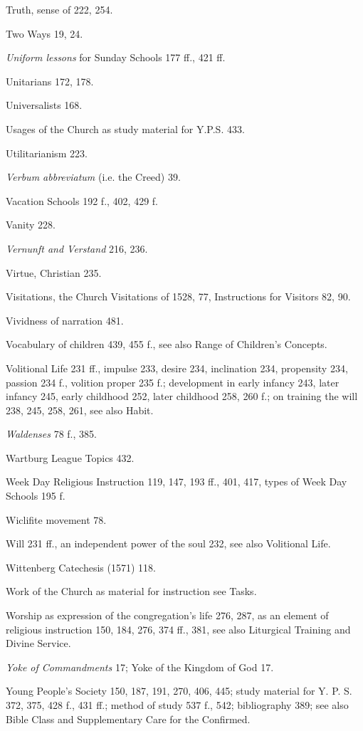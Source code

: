 Truth, sense of 222, 254.

Two Ways 19, 24.

\emph{Uniform lessons} for Sunday Schools 177 ff., 421 ff.

Unitarians 172, 178.

Universalists 168.

Usages of the Church as study material for Y.P.S. 433.

Utilitarianism 223.

\emph{\emph{Verbum abbreviatum}} (i.e. the Creed) 39.

Vacation Schools 192 f., 402, 429 f.

Vanity 228.

\emph{Vernunft and Verstand} 216, 236.

Virtue, Christian 235.

Visitations, the Church Visitations of 1528, 77, Instructions for Visitors 82, 90.

Vividness of narration 481.

Vocabulary of children 439, 455 f., see also Range of Children’s Concepts.

Volitional Life 231 ff., impulse 233, desire 234, inclination 234, propensity 234, passion 234 f., volition proper 235 f.; development in early infancy 243, later infancy 245, early childhood 252, later childhood 258, 260 f.; on training the will 238, 245, 258, 261, see also Habit.

\emph{Waldenses} 78 f., 385.

Wartburg League Topics 432.

Week Day Religious Instruction 119, 147, 193 ff., 401, 417, types of Week Day Schools 195 f.

Wiclifite movement 78.

Will 231 ff., an independent power of the soul 232, see also Volitional Life.

Wittenberg Catechesis (1571) 118.

Work of the Church as material for instruction see Tasks.

Worship as expression of the congregation’s life 276, 287, as an element of religious instruction 150, 184, 276, 374 ff., 381, see also Liturgical Training and Divine Service.

\emph{Yoke of Commandments} 17; Yoke of the Kingdom of God 17.

Young People’s Society 150, 187, 191, 270, 406, 445; study material for Y. P. S. 372, 375, 428 f., 431 ff.; method of study 537 f., 542; bibliography 389; see also Bible Class and Supplementary Care for the Confirmed.
